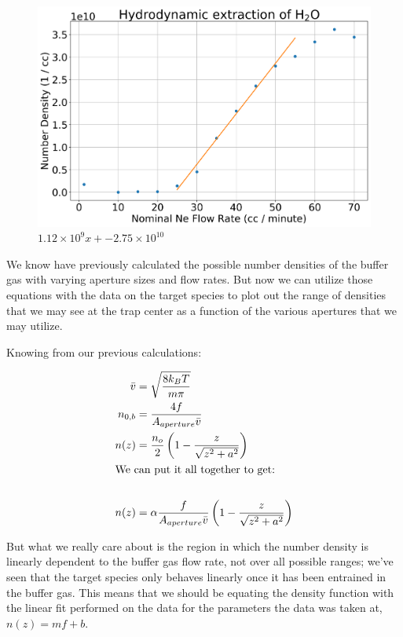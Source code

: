 \begin{figure}[H]
	\centering
	\includegraphics[width=1\textwidth]{images/CBGB_hydrodynamic_fit.png}
	\caption{$1.12 \times 10^9 x + -2.75 \times 10^10$}
	\label{f: rga}
\end{figure}

We know have previously calculated the possible number densities of the buffer gas with varying aperture sizes and flow rates. But now we can utilize those equations with the data on the target species to plot out the range of densities that we may see at the trap center as a function of the various apertures that we may utilize.

Knowing from our previous calculations:

\begin{align*}
	\bar{v} & = \sqrt{\frac{8 k_B T}{m \pi}} \\
	n_{0,b} & = \frac{4 f}{A_{aperture} \bar{v}} \\
	n(z) & = \frac{n_o}{2}\left(1-\frac{z}{\sqrt{z^2+a^2}}\right) \\
	\intertext{We can put it all together to get:} \\
	n(z) &= \alpha\frac{f}{A_{aperture} \bar{v}}\left(1-\frac{z}{\sqrt{z^2+a^2}}\right)
\end{align*}

But what we really care about is the region in which the number density is linearly dependent to the buffer gas flow rate, not over all possible ranges; we've seen that the target species only behaves linearly once it has been entrained in the buffer gas. This means that we should be equating the density function with the linear fit performed on the data for the parameters the data was taken at, $n(z)=mf+b$.

